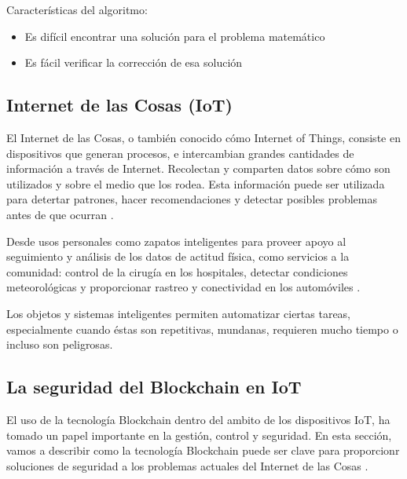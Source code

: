 \vspace{5mm}

\noindent Características del algoritmo: 

\begin{itemize}
    \item Es difícil encontrar una solución para el problema matemático
    \item Es fácil verificar la corrección de esa solución
\end{itemize}

\subsection{Internet de las Cosas (IoT)}

El Internet de las Cosas, o también conocido cómo Internet of Things, consiste en dispositivos que generan procesos, e 
intercambian grandes cantidades de información a través de Internet. Recolectan y comparten datos sobre cómo son 
utilizados y sobre el medio que los rodea. Esta información puede ser utilizada para detertar patrones, hacer 
recomendaciones y detectar posibles problemas antes de que ocurran \cite{what-is-iot, novo2018blockchain}.

\vspace{5mm}

\noindent Desde usos personales como zapatos inteligentes para proveer apoyo al seguimiento y análisis de los datos de 
actitud física, como servicios a la comunidad: control de la cirugía en los hospitales, detectar condiciones 
meteorológicas y proporcionar rastreo y conectividad en los automóviles \cite{khan2018iot}.

\vspace{5mm}

\noindent  Los objetos y sistemas inteligentes permiten automatizar ciertas tareas, especialmente cuando éstas son 
repetitivas, mundanas, requieren mucho tiempo o incluso son peligrosas.

\subsection{La seguridad del Blockchain en IoT}

El uso de la tecnología Blockchain dentro del ambito de los dispositivos IoT, ha tomado un papel importante en la 
gestión, control y seguridad. En esta sección, vamos a describir como la tecnología Blockchain puede ser clave para
proporcionr soluciones de seguridad a los problemas actuales del Internet de las Cosas 
\cite{khan2018iot, reyna2018blockchain}.

